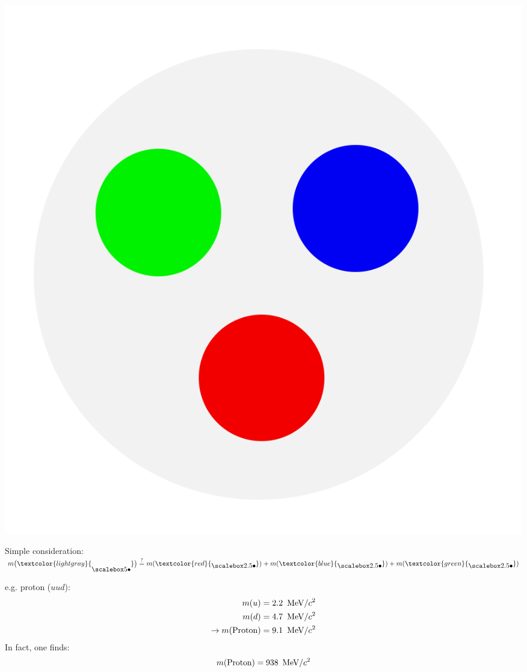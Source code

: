 \subsection{}
\begin{frame}
\begin{minipage} {0.3\textwidth}
\includegraphics[width=\textwidth]{Figures Introductory Lecture/Standard Model/Hadron_coloured.png}
\end{minipage}
\begin{minipage} {0.65\textwidth}
Simple consideration:\\  $m\big( \textcolor{lightgray}{ \BigbulletG}\big)\overset{?}{=}m(\textcolor{red}{\Bigbullet})+m(\textcolor{blue}{\Bigbullet})+m(\textcolor{green}{\Bigbullet})$
\end{minipage}
e.g. proton ($uud$):\\
\begin{align*} 
m(u)&=2.2  \,\textmd{ MeV}/c^2\\m(d)&= 4.7 \, \textmd{ MeV}/c^2 \\ \rightarrow m(\textmd{Proton})&=9.1  \,\textmd{ MeV}/c^2
\end{align*} 
In fact, one finds:
\begin{align*} 
m(\textmd{Proton})=938  \,\textmd{ MeV}/c^2
\end{align*} 
\end{frame}
